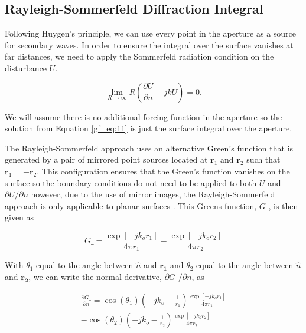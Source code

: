 \subsection{Rayleigh-Sommerfeld Diffraction Integral}
Following Huygen's principle, we can use every point in the aperture as a source for secondary waves. In order to ensure the integral over the surface vanishes at far distances, we need to apply the Sommerfeld radiation condition on the disturbance $U$.

\begin{equation}
 \lim_{R\to\infty} R\left(\frac{\partial U}{\partial n} -jkU \right) = 0.
\label{gf_eq:48}
\end{equation}
\renewcommand{\baselinestretch}{2} \small\normalsize

We will assume there is no additional forcing function in the aperture so the solution from Equation \ref{gf_eq:11} is just the surface integral over the aperture.

The Rayleigh-Sommerfeld approach uses an alternative Green's function that is generated by a pair of mirrored point sources located at $\mathbf{r}_1$ and $\mathbf{r}_2$ such that $\mathbf{r}_1 = -\mathbf{r}_2$. This configuration ensures that the Green's function vanishes on the surface so the boundary conditions do not need to be applied to both $U$ and $\partial U/\partial n$ however, due to the use of mirror images, the Rayleigh-Sommerfeld approach is only applicable to planar surfaces \cite{goodman_fourier}. This Greens function, $G\_$, is then given as

\begin{equation}
G\_= \frac{\exp[-jk_or_1]}{4\pi r_1} - \frac{\exp[-jk_or_2]}{4\pi r_2}
\label{gf_eq:49}
\end{equation}
\renewcommand{\baselinestretch}{2} \small\normalsize

With $\theta_1$ equal to the angle between $\hat{n}$ and $\mathbf{r_1}$ and $\theta_2$ equal to the angle between $\hat{n}$ and $\mathbf{r_2}$, we can write the normal derivative, $\partial G\_/\partial n$, as 

\begin{equation}
\begin{gathered}
\frac{\partial G\_}{\partial n}
=\cos(\theta_1)\left(-jk_o - \frac{1}{r_1} \right)\frac{\exp[-jk_or_1]}{4\pi r_1} \\
-\cos(\theta_2)\left(-jk_o - \frac{1}{r_2} \right)\frac{\exp[-jk_or_2]}{4\pi r_2}\\
\end{gathered}
\label{gf_eq:50}
\end{equation}
\renewcommand{\baselinestretch}{2} \small\normalsize

